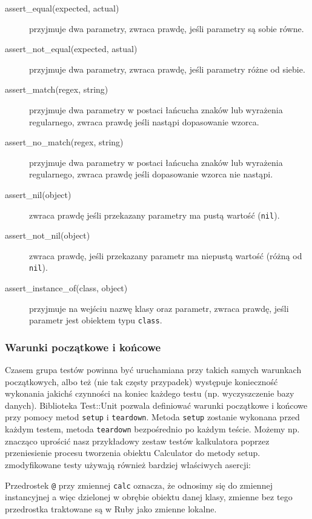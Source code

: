     \begin{description}
       \item[assert\_equal(expected, actual)] przyjmuje dwa parametry, zwraca prawdę, jeśli parametry są sobie równe.
       \item[assert\_not\_equal(expected, astual)] przyjmuje dwa parametry, zwraca prawdę, jeśli parametry różne od siebie.
       \item[assert\_match(regex, string)] przyjmuje dwa parametry w postaci łańcucha znaków lub wyrażenia regularnego, zwraca prawdę jeśli nastąpi dopasowanie wzorca.
       \item[assert\_no\_match(regex, string)] przyjmuje dwa parametry w postaci łańcucha znaków lub wyrażenia regularnego, zwraca prawdę jeśli dopasowanie wzorca nie nastąpi.
       \item[assert\_nil(object)] zwraca prawdę jeśli przekazany parametry ma pustą wartość (\verb+nil+).
       \item[assert\_not\_nil(object)] zwraca prawdę, jeśli przekazany parametr ma niepustą wartość (różną od \verb+nil+).
       \item[assert\_instance\_of(class, object)] przyjmuje na wejściu nazwę klasy oraz parametr, zwraca prawdę, jeśli parametr jest obiektem typu \verb+class+.
    \end{description}
    
    \subsubsection{Warunki początkowe i końcowe}
    Czasem grupa testów powinna być uruchamiana przy takich samych warunkach początkowych, albo też (nie tak częsty przypadek) występuje konieczność wykonania jakichś czynności na koniec każdego testu (np. wyczyszczenie bazy danych). Biblioteka Test::Unit pozwala definiować warunki początkowe i końcowe przy pomocy metod \verb+setup+ i \verb+teardown+.
    Metoda \verb+setup+ zostanie wykonana przed każdym testem, metoda \verb+teardown+ bezpośrednio po każdym teście. Możemy np. znacząco uprościć nasz przykładowy zestaw testów kalkulatora poprzez przeniesienie procesu tworzenia obiektu Calculator do metody setup. zmodyfikowane testy używają również bardziej właściwych asercji:
    
    
    
    Przedrostek \verb+@+ przy zmiennej \verb+calc+ oznacza, że odnosimy się do zmiennej instancyjnej a więc dzielonej w obrębie obiektu danej klasy, zmienne bez tego przedrostka traktowane są w Ruby jako zmienne lokalne.
    

